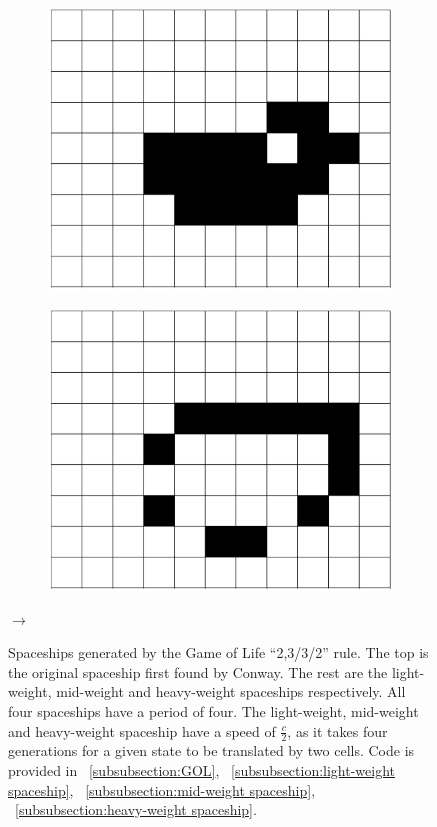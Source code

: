 \documentclass[12pt]{article}
\numberwithin{figure}{section} %
\begin{document}
\begin{figure}[H]
\begin{subfigure}{0.18\textwidth}
     		\centering
     		\includegraphics[width=\linewidth]{Section1/7.3}
     		\subcaption{}
   	\end{subfigure}
   	\begin{subfigure}{0.18\textwidth}
     		\centering
     		\includegraphics[width=\linewidth]{Section1/7.4}
     		\subcaption{}
   	\end{subfigure}
   	{\LARGE$\xrightarrow{}$}
	\caption[Spaceships in the Game of Life]{Spaceships generated by the Game of Life “2,3/3/2” rule. The top is the original spaceship first found by Conway. The rest are the light-weight, mid-weight and heavy-weight spaceships respectively. All four spaceships have a period of four. The light-weight, mid-weight and heavy-weight spaceship have a speed of $\frac{c}{2}$, as it takes four generations for a given state to be translated by two cells. Code is provided in ~\ref{subsubsection:GOL}, ~\ref{subsubsection:light-weight spaceship}, ~\ref{subsubsection:mid-weight spaceship}, ~\ref{subsubsection:heavy-weight spaceship}.}
	\label{fig:GOL examples}
	\vspace{-1.5em}
\end{figure}
\end{document}
